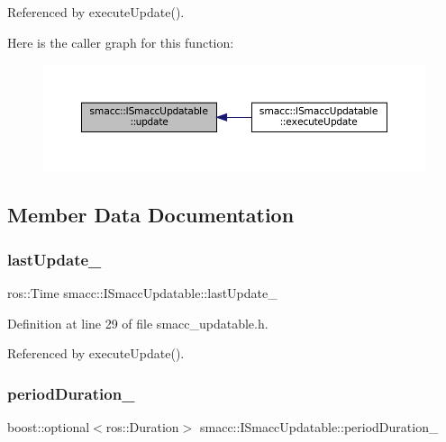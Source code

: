 Referenced by execute\+Update().

Here is the caller graph for this function\+:
\nopagebreak
\begin{figure}[H]
\begin{center}
\leavevmode
\includegraphics[width=350pt]{classsmacc_1_1ISmaccUpdatable_a84ee0520cbefdb1d412bed54650b028e_icgraph}
\end{center}
\end{figure}


\subsection{Member Data Documentation}
\mbox{\label{classsmacc_1_1ISmaccUpdatable_ad58f7e1cd26d3fe8c3a3fccecc57feac}} 
\subsubsection{\texorpdfstring{last\+Update\+\_\+}{lastUpdate\_}}
{\footnotesize\ttfamily ros\+::\+Time smacc\+::\+I\+Smacc\+Updatable\+::last\+Update\+\_\+\hspace{0.3cm}{\ttfamily [private]}}



Definition at line 29 of file smacc\+\_\+updatable.\+h.



Referenced by execute\+Update().

\mbox{\label{classsmacc_1_1ISmaccUpdatable_ad02d9798ac5609f3ecb9fb8a46febc18}} 
\subsubsection{\texorpdfstring{period\+Duration\+\_\+}{periodDuration\_}}
{\footnotesize\ttfamily boost\+::optional$<$ros\+::\+Duration$>$ smacc\+::\+I\+Smacc\+Updatable\+::period\+Duration\+\_\+\hspace{0.3cm}{\ttfamily [private]}}



